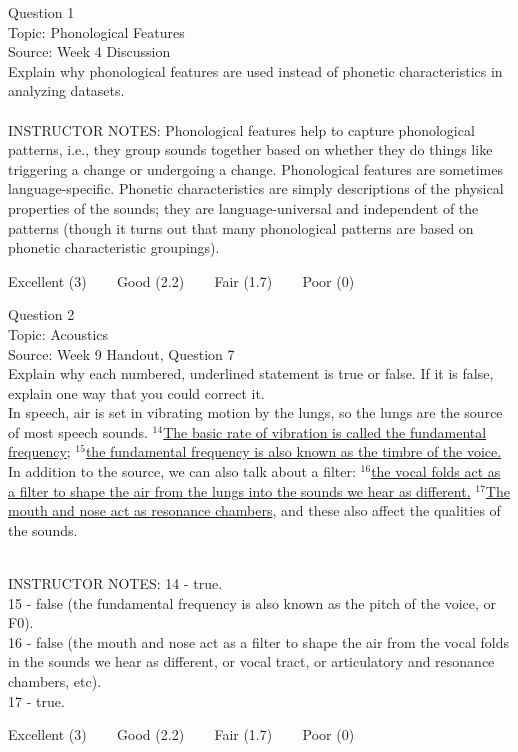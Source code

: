 \documentclass[12pt]{article}
\begin{document}
{\large Question 1}\\

Topic: Phonological Features\\
Source: Week 4 Discussion\\

Explain why phonological features are used instead of phonetic characteristics in analyzing datasets.\\


~\\
INSTRUCTOR NOTES: Phonological features help to capture phonological patterns, i.e., they group sounds together based on whether they do things like triggering a change or undergoing a change. Phonological features are sometimes language-specific. Phonetic characteristics are simply descriptions of the physical properties of the sounds; they are language-universal and independent of the patterns (though it turns out that many phonological patterns are based on phonetic characteristic groupings).


\vfill
Excellent (3) ~~~ Good (2.2) ~~~ Fair (1.7) ~~~ Poor (0)
\newpage

{\large Question 2}\\

Topic: Acoustics\\
Source: Week 9 Handout, Question 7\\

Explain why each numbered, underlined statement is true or false. If it is false, explain one way that you could correct it.\\

In speech, air is set in vibrating motion by the lungs, so the lungs are the source of most speech sounds. $^{14}$\ul{The basic rate of vibration is called the fundamental frequency}; $^{15}$\ul{the fundamental frequency is also known as the timbre of the voice.} In addition to the source, we can also talk about a filter: $^{16}$\ul{the vocal folds act as a filter to shape the air from the lungs into the sounds we hear as different.} $^{17}$\ul{The mouth and nose act as resonance chambers}, and these also affect the qualities of the sounds.


~\\
INSTRUCTOR NOTES: 14 - true.\\15 - false (the fundamental frequency is also known as the pitch of the voice, or F0).\\16 - false (the mouth and nose act as a filter to shape the air from the vocal folds in the sounds we hear as different, or vocal tract, or articulatory and resonance chambers, etc).\\17 - true.


\vfill
Excellent (3) ~~~ Good (2.2) ~~~ Fair (1.7) ~~~ Poor (0)
\newpage

\begin{center}
\textbf{{\color{red}{\HUGE END OF EXAM}}}\\

\end{center}
\newpage
\end{document}
